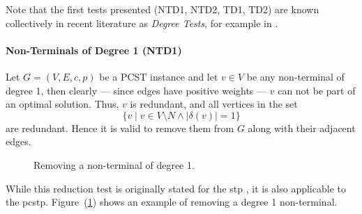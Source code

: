  Note that the first tests presented (NTD1, NTD2, TD1, TD2) are known collectively
 in recent literature as \textit{Degree Tests}, for example in \citet{rehfeldt2016reduction}.
\paragraph{Non-Terminals of Degree 1 (NTD1)}\label{sec:red:test:deg1}
Let $G = (V, E, c, p)$ be a PCST instance and let $v \in V$ be any non-terminal of degree 1, then
clearly
--- since edges have positive weights ---
$v$ can not be part of an optimal solution.
Thus, $v$ is redundant, and
 all vertices in the set
 $$\{v \mid v \in V \setminus N \wedge |\delta(v)| = 1\}$$
 are redundant. Hence it is valid to remove them from $G$ along with their adjacent edges.

\begin{figure}[h]\centering
  \caption{Removing a non-terminal of degree 1.}\label{fig:red:test:deg1}
\end{figure}

 While this reduction test is originally stated for the \gls{stp} \citep{hwang1992steiner}, it is also applicable to the \gls{pcstp}. Figure~(\ref{fig:red:test:deg1})
  shows an example of removing a degree 1 non-terminal.

